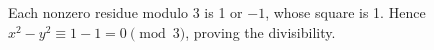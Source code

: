 Each nonzero residue modulo 3 is 1 or $-1$, whose square is 1. Hence $x^2-y^2\equiv1-1=0\pmod3$, proving the divisibility.
